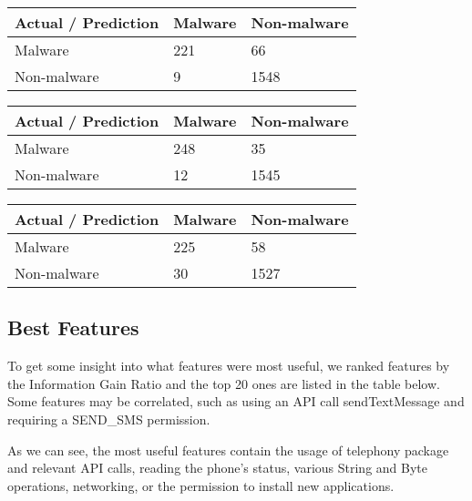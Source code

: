 \begin{tabular}{|l|l l|}
\hline
Actual / Prediction & Malware & Non-malware \\
\hline
Malware & 221 & 66 \\
Non-malware & 9 & 1548 \\
\hline
\end{tabular}
\begin{tabular}{|l|l l|}
\hline
Actual / Prediction & Malware & Non-malware \\
\hline
Malware & 248 & 35 \\
Non-malware & 12 & 1545 \\
\hline
\end{tabular}
\begin{tabular}{|l|l l|}
\hline
Actual / Prediction & Malware & Non-malware \\
\hline
Malware & 225 & 58 \\
Non-malware & 30 & 1527 \\
\hline
\end{tabular}


\subsection{Best Features}
To get some insight into what features were most useful, we ranked features by the Information Gain Ratio and the top 20 ones are listed in the table below. Some features may be correlated, such as using an API call sendTextMessage and requiring a SEND\_SMS permission.

As we can see, the most useful features contain the usage of telephony package and relevant API calls, reading the phone's status, various String and Byte operations, networking, or the permission to install new applications. 

